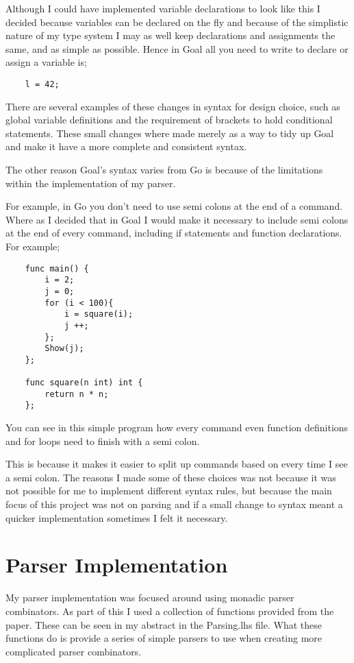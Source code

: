 Although I could have implemented variable declarations to look like this I decided because variables can be declared on the fly and because of the simplistic nature of my type system I may as well keep declarations and assignments the same, and as simple as possible. Hence in Goal all you need to write to declare or assign a variable is;

\begin{lstlisting}
	l = 42;
\end{lstlisting}
 
There are several examples of these changes in syntax for design choice, such as global variable definitions and the requirement of brackets to hold conditional statements. These small changes where made merely as a way to tidy up Goal and make it have a more complete and consistent syntax. 

The other reason Goal's syntax varies from Go is because of the limitations within the implementation of my parser. 

For example, in Go you don't need to use semi colons at the end of a command. Where as I decided that in Goal I would make it necessary to include semi colons at the end of every command, including if statements and function declarations. For example;

\begin{lstlisting}
	func main() {
	    i = 2;
	    j = 0;
	    for (i < 100){
	        i = square(i);
	        j ++;
	    };
	    Show(j);		
	};
	
	func square(n int) int {
		return n * n;
	};
\end{lstlisting}

You can see in this simple program how every command even function definitions and for loops need to finish with a semi colon.

This is because it makes it easier to split up commands based on every time I see a semi colon. The reasons I made some of these choices was not because it was not possible for me to implement different syntax rules, but because the main focus of this project was not on parsing and if a small change to syntax meant a quicker implementation sometimes I felt it necessary. 


\section{Parser Implementation}

My parser implementation was focused around using monadic parser combinators. As part of this I used a collection of functions provided from the paper. %
These can be seen in my abstract in the Parsing.lhs file. What these functions do is provide a series of simple parsers to use when creating more complicated parser combinators. 

